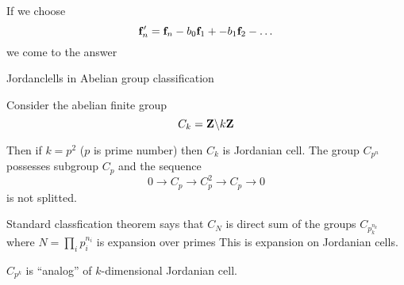 If we choose 
        $$
     {\bf f}'_n={\bf f}_n-b_0{\bf f}_1+-b_1{\bf f}_2-\dots
        $$
we come to the answer\finish         


      \centerline {Jordanclells in Abelian group classification}

Consider the abelian finite group 
         $$
       C_k={\bf Z}\backslash k{\bf Z}
         $$

Then if $k=p^2$ ($p$ is prime number) then $C_k$ is Jordanian cell.
The group $C_{p^n}$ possesses subgroup $C_p$ and the sequence
       $$
  0\rightarrow C_p\rightarrow C_p^2\rightarrow C_p\rightarrow 0
       $$ 
is not splitted.


  Standard classfication theorem says  
        that $C_N$ is direct sum of the groups
   $C_{p_k^{n_k}}$ where $N=\prod_i p_i^{n_i}$ is expansion over primes
This is expansion on Jordanian cells.

   $C_{p^k}$ is ``analog'' of $k$-dimensional  Jordanian cell. 
\bye
